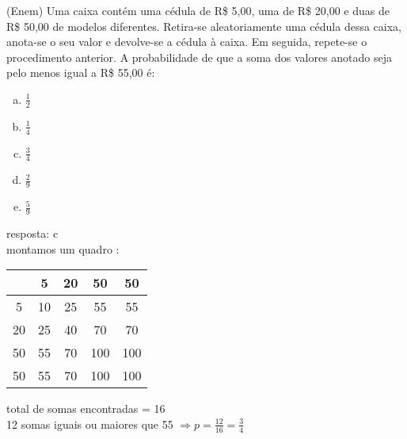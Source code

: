 \begin{ex}
   (Enem) Uma caixa contém uma cédula de R\$ 5,00, uma de R\$ 20,00 e duas de R\$ 50,00 de modelos diferentes. Retira-se aleatoriamente uma cédula dessa caixa, anota-se o seu valor e devolve-se a cédula à caixa. Em seguida, repete-se o procedimento anterior. A probabilidade de que a soma dos valores anotado seja pelo menos igual a R\$ 55,00 é:
     \begin{enumerate} [(a)]
         \item $\frac{1}{2}$
         \item $\frac{1}{4}$
         \item $\frac{3}{4}$
         \item $\frac{2}{9}$
         \item $\frac{5}{9}$
     \end{enumerate}
       \begin{sol}
        resposta: c \\ 
        montamos um quadro :  \\
        \begin{tabular}{c|c|c|c|c} \hline 
         &  5 & 20 & 50 &  50 \\  \hline
       5 & 10 & 25 & 55 &  55  \\  \hline
      20 & 25 & 40 & 70 &  70  \\  \hline
      50 & 55 & 70 &100 & 100  \\  \hline
      50 & 55 & 70 &100 & 100  \\  \hline
        \end{tabular}  
       total de somas encontradas = 16  \\
       12 somas iguais ou maiores que 55 \hspace{0,4cm}
       $\Longrightarrow  p = \frac{12}{16}=\frac{3}{4}$
       
       \end{sol}
  \end{ex}